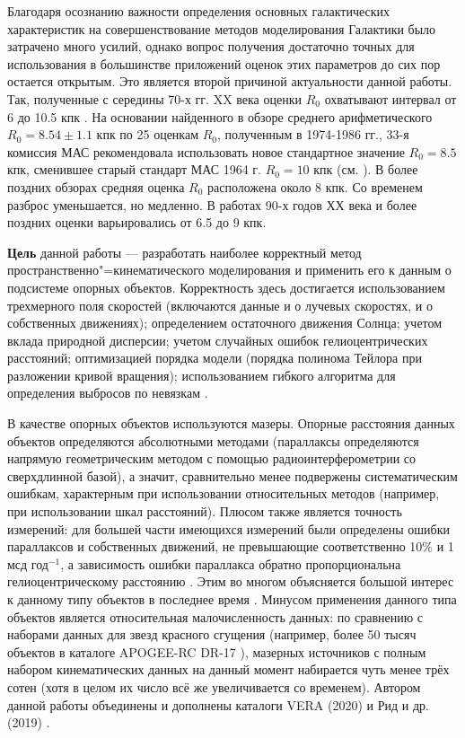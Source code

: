 \documentclass[a4paper, oneside, 14pt]{article}
\begin{document}
Благодаря осознанию важности определения основных галактических характеристик на совершенствование методов моделирования Галактики было затрачено много усилий, однако вопрос получения достаточно точных для использования в большинстве приложений оценок этих параметров до сих пор остается открытым. Это является второй причиной актуальности данной работы. Так, полученные с середины 70-х гг. XX века оценки $ R_0 $ охватывают интервал от 6 до 10.5 кпк \cite{K.L.1986, F.1987, R.1993}. На основании найденного в обзоре \cite{K.L.1986} среднего арифметического $ R_0 = 8.54 \pm 1.1 $ кпк по 25 оценкам $ R_0 $, полученным в 1974-1986 гг., 33-я комиссия МАС рекомендовала использовать новое стандартное значение $ R_0 = 8.5 $ кпк, сменившее старый стандарт МАС 1964 г. $ R_0 = 10 $ кпк (см. \cite{F.T.1991}). В более поздних обзорах \cite{R.1993, N.2004} средняя оценка $ R_0 $ расположена около 8 кпк. Со временем разброс уменьшается, но медленно. В работах 90-х годов ХХ века и более поздних оценки варьировались от 6.5 до 9 кпк.

\textbf{Цель} данной работы --- разработать наиболее корректный метод пространственно"=кинематического моделирования и применить его к данным о подсистеме опорных объектов. Корректность здесь достигается использованием трехмерного поля скоростей (включаются данные и о лучевых скоростях, и о собственных движениях); определением остаточного движения Солнца; учетом вклада природной дисперсии; учетом случайных ошибок гелиоцентрических расстояний; оптимизацией порядка модели (порядка полинома Тейлора при разложении кривой вращения); использованием гибкого алгоритма для определения выбросов по невязкам \cite{N.2012}.

В качестве опорных объектов используются мазеры. Опорные расстояния данных объектов определяются абсолютными методами (параллаксы определяются напрямую геометрическим методом с помощью радиоинтерферометрии со сверхдлинной базой), а значит, сравнительно менее подвержены систематическим ошибкам, характерным при использовании относительных методов (например, при использовании шкал расстояний). Плюсом также является точность измерений: для большей части имеющихся измерений были определены ошибки параллаксов и собственных движений, не превышающие соответственно 10\% и 1 мсд год$^{-1}$, а зависимость ошибки параллакса обратно пропорциональна гелиоцентрическому расстоянию \cite{N.V.2018}. Этим во многом объясняется большой интерес к данному типу объектов в последнее время \cite{R.2009, R.2014, R.2019, B.B.2014, B.B.2015}. Минусом применения данного типа объектов является относительная малочисленность данных: по сравнению с наборами данных для звезд красного сгущения \cite{V.2019} (например, более 50 тысяч объектов в каталоге APOGEE-RC DR-17 \cite{DR17-APOGEE}), мазерных источников с полным набором кинематических данных на данный момент набирается чуть менее трёх сотен (хотя в целом их число всё же увеличивается со временем). Автором данной работы объединены и дополнены каталоги VERA (2020) \cite{VERA.2020} и Рид и др. (2019) \cite{R.2019}.
\end{document}
